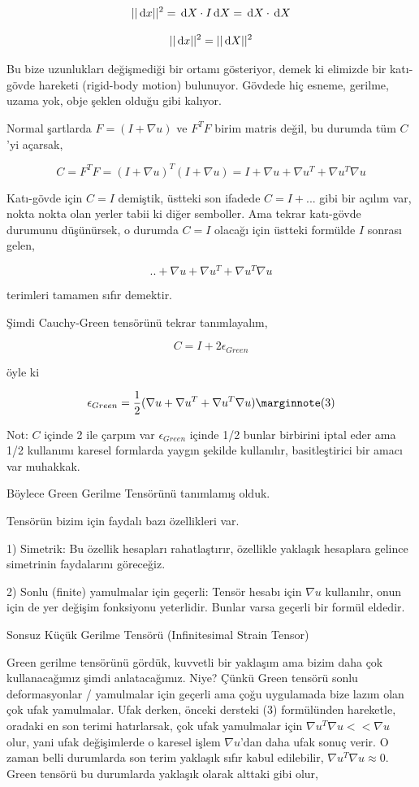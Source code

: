 \documentclass[12pt,fleqn]{article}\usepackage{../../common}
\begin{document}
$$
||\,\mathrm{d} x||^2  = \,\mathrm{d} X \cdot I \,\mathrm{d} X = \,\mathrm{d} X \cdot \,\mathrm{d} X
$$

$$
||\,\mathrm{d} x||^2 = ||\,\mathrm{d} X||^2
$$

Bu bize uzunlukları değişmediği bir ortamı gösteriyor, demek ki elimizde
bir katı-gövde hareketi (rigid-body motion) bulunuyor. Gövdede hiç esneme,
gerilme, uzama yok, obje şeklen olduğu gibi kalıyor.

Normal şartlarda $F = (I+\nabla u)$ ve $F^T F$ birim matris değil, bu durumda
tüm $C$'yi açarsak,

$$
C = F^T F = (I+\nabla u)^T (I+\nabla u) =
I + \nabla u + \nabla u^T + \nabla u^T \nabla u
$$

Katı-gövde için $C = I$ demiştik, üstteki son ifadede $C = I + ...$  gibi
bir açılım var, nokta nokta olan yerler tabii ki diğer semboller. Ama
tekrar katı-gövde durumunu düşünürsek, o durumda $C = I$ olacağı için
üstteki formülde $I$ sonrası gelen,

$$
.. + \nabla u + \nabla u^T + \nabla u^T \nabla u
$$

terimleri tamamen sıfır demektir.

Şimdi Cauchy-Green tensörünü tekrar tanımlayalım,

$$
C = I + 2 \epsilon_{Green} 
$$

öyle ki 

$$
\epsilon_{Green} = \frac{1}{2} (\nabla u + \nabla u^T + \nabla u^T \nabla u )
\mlabel{3}
$$

Not: $C$ içinde 2 ile çarpım var $\epsilon_{Green}$ içinde 1/2 bunlar birbirini
iptal eder ama 1/2 kullanımı karesel formlarda yaygın şekilde kullanılır,
basitleştirici bir amacı var muhakkak. 

Böylece Green Gerilme Tensörünü tanımlamış olduk.

Tensörün bizim için faydalı bazı özellikleri var.

1) Simetrik: Bu özellik hesapları rahatlaştırır, özellikle yaklaşık
hesaplara gelince simetrinin faydalarını göreceğiz. 

2) Sonlu (finite) yamulmalar için geçerli: Tensör hesabı için $\nabla u$
kullanılır, onun için de yer değişim fonksiyonu yeterlidir. Bunlar varsa geçerli
bir formül eldedir.

Sonsuz Küçük Gerilme Tensörü (Infinitesimal Strain Tensor)

Green gerilme tensörünü gördük, kuvvetli bir yaklaşım ama bizim daha çok
kullanacağımız şimdi anlatacağımız. Niye? Çünkü Green tensörü sonlu
deformasyonlar / yamulmalar için geçerli ama çoğu uygulamada bize lazım olan çok
ufak yamulmalar. Ufak derken, önceki dersteki (3) formülünden hareketle, oradaki
en son terimi hatırlarsak, çok ufak yamulmalar için $\nabla u^T \nabla u << \nabla u$ 
olur, yani ufak değişimlerde o karesel işlem $\nabla u$'dan daha ufak sonuç
verir. O zaman belli durumlarda son terim yaklaşık sıfır kabul edilebilir,
$\nabla u^T \nabla u \approx 0$. Green tensörü bu durumlarda yaklaşık
olarak alttaki gibi olur,
\end{document}
